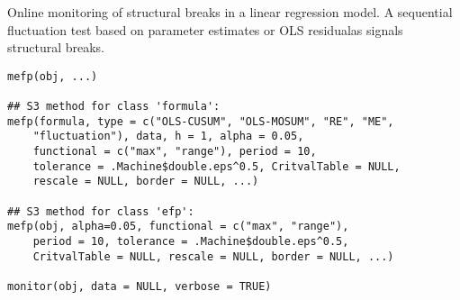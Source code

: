 \begin{Description}\relax
Online monitoring of structural breaks in a linear regression model. A
sequential fluctuation test based on parameter estimates or OLS residualas
signals structural breaks.\end{Description}
\begin{Usage}
\begin{verbatim}
mefp(obj, ...)

## S3 method for class 'formula':
mefp(formula, type = c("OLS-CUSUM", "OLS-MOSUM", "RE", "ME",
    "fluctuation"), data, h = 1, alpha = 0.05,
    functional = c("max", "range"), period = 10,
    tolerance = .Machine$double.eps^0.5, CritvalTable = NULL,
    rescale = NULL, border = NULL, ...)

## S3 method for class 'efp':
mefp(obj, alpha=0.05, functional = c("max", "range"),
    period = 10, tolerance = .Machine$double.eps^0.5,
    CritvalTable = NULL, rescale = NULL, border = NULL, ...)

monitor(obj, data = NULL, verbose = TRUE)
\end{verbatim}
\end{Usage}
